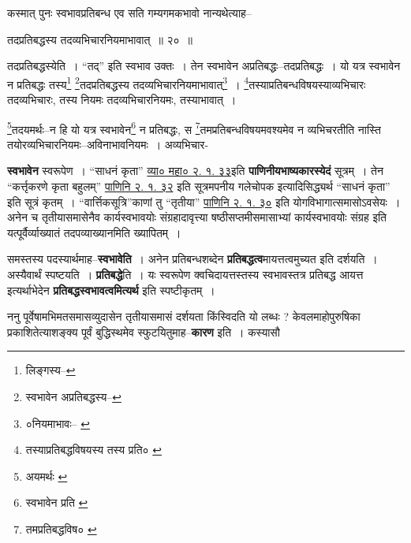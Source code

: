 \documentclass[article,12pt,a4paper]{memoir}
\begin{document}
	  \pstart कस्मात् पुनः स्वभावप्रतिबन्ध एव सति गम्यगमकभावो नान्यथेत्याह--
	\pend
       
	  \bigskip
	  \begingroup
	

	  \pstart तदप्रतिबद्धस्य तदव्यभिचारनियमाभावात् ॥ २० ॥
	\pend
      
	  \endgroup
	 

	  \pstart तदप्रतिबद्धस्येति । “तद्” इति स्वभाव उक्तः । तेन स्वभावेन अप्रतिबद्धः--तदप्रतिबद्धः । यो यत्र स्वभावेन न प्रतिबद्धः तस्य\footnote{लिङ्गस्य--\cite{dp-msD-n}} \footnote{स्वभावेन अप्रतिबद्धस्य--\cite{dp-msD-n}}\-तदप्रतिबद्धस्य तदव्यभिचारनियमाभावात्\footnote{०नियमाभावः--\cite{dp-msA} \cite{dp-edP} \cite{dp-edH} \cite{dp-edE}} । \footnote{तस्याप्रतिबद्धविषयस्य \cite{dp-msA} \cite{dp-edP} \cite{dp-edH} तस्य प्रति० \cite{dp-edN}}\-तस्याप्रतिबन्धविषयस्याव्यभिचारः तदव्यभिचारः, तस्य नियमः तदव्यभिचारनियमः, तस्याभावात् ।
	\pend
       

	  \pstart \footnote{अयमर्थः \cite{dp-msA} \cite{dp-msB} \cite{dp-msC} \cite{dp-msD} \cite{dp-edP} \cite{dp-edH} \cite{dp-edE} \cite{dp-edN}}\-तदयमर्थः--न हि यो यत्र स्वभावेन\footnote{स्वभावेन प्रति \cite{dp-msB}} न प्रतिबद्धः, स \footnote{तमप्रतिबद्धविष० \cite{dp-msA} \cite{dp-edP} \cite{dp-edH}}\-तमप्रतिबन्धविषयमवश्यमेव न व्यभिचरतीति नास्ति तयोरव्यभिचारनियमः--अविनाभावनियमः । अव्यभिचार-
	\pend
      
	  \endgroup
	

	  \pstart \textbf{स्वभावेन} स्वरूपेण । “साधनं कृता” \href{http://http://sarit.indology.info/?cref=vk-mbh.2.1.33}{व्या० महा० २. १. ३३}इति \textbf{पाणिनीयभाष्यकारस्येदं} सूत्रम् । तेन “कर्त्तृकरणे कृता बहुलम्” \href{http://http://sarit.indology.info/?cref=Pā.2.1.32}{पाणिनि २. १. ३२} इति सूत्रमपनीय गलेचोपक इत्यादिसिद्ध्यर्थ “साधनं कृता” इति सूत्रं कृतम् । “वार्त्तिकसूत्रि”काणां तु “तृतीया” \href{http://http://sarit.indology.info/?cref=Pā.2.1.30}{पाणिनि
	    २. १. ३०} इति योगविभागात्समासोऽवसेयः । अनेन च तृतीयासमासेनैव कार्यस्वभावयोः संग्रहादावृत्त्या षष्ठीसप्तमीसमासाभ्यां कार्यस्वभावयोः संग्रह इति यत्पूर्वैर्व्याख्यातं तदपव्याख्यानमिति ख्यापितम् ।
	\pend
      

	  \pstart समस्तस्य पदस्यार्थमाह--\textbf{स्वभावेति} । अनेन प्रतिबन्धशब्देन \textbf{प्रतिबद्धत्व}मायत्तत्वमुच्यत इति दर्शयति । अस्यैवार्थं स्पष्टयति । \textbf{प्रतिबद्धे}ति । यः स्वरूपेण क्वचिदायत्तस्तस्य स्वभावस्तत्र प्रतिबद्ध आयत्त इत्यर्थाभेदेन \textbf{प्रतिबद्धस्वभावत्वमित्यर्थ} इति स्पष्टीकृतम् ।
	\pend
      

	  \pstart ननु पूर्वेषामभिमतसमासव्युदासेन तृतीयासमासं दर्शयता किंस्विदति यो लब्धः ? केवलमाहोपुरुषिका प्रकाशितेत्याशङ्क्य पूर्वं बुद्धिस्थमेव स्फुटयितुमाह--\textbf{कारण} इति । कस्यासौ
	\pend
	  \bigskip
	  \begingroup
	
\end{document}
